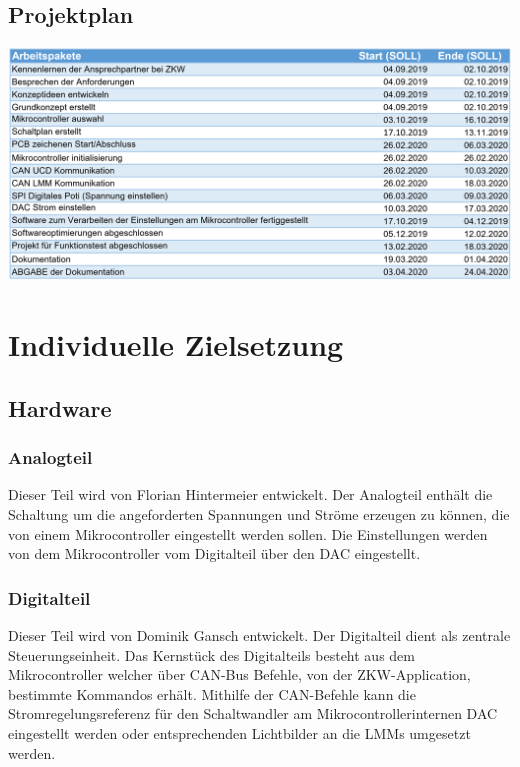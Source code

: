 \documentclass[paper=a4, 12pt]{scrreprt}
\begin{document}
	\section{Projektplan}\hfill \break
	\begin{adjustbox}{center,nofloat=figure,vspace=\bigskipamount}
		\includegraphics[width=\textwidth]{img/plan.PNG}
	\end{adjustbox}
	

\chapter{Individuelle Zielsetzung}\hfill \break
    \section{Hardware}    	\hfill \break
    	\subsection{Analogteil}\hfill \break
        Dieser Teil wird von Florian Hintermeier entwickelt. Der Analogteil enthält die Schaltung um die angeforderten Spannungen und Ströme erzeugen zu können, die von einem Mikrocontroller eingestellt werden sollen. Die Einstellungen werden von dem Mikrocontroller vom Digitalteil über den DAC eingestellt.
        
        \subsection{Digitalteil}\hfill \break
        Dieser Teil wird von Dominik Gansch entwickelt. Der Digitalteil dient als zentrale Steuerungseinheit. Das Kernstück des Digitalteils besteht aus dem Mikrocontroller welcher über CAN-Bus Befehle, von der ZKW-Application, bestimmte Kommandos erhält. Mithilfe der  CAN-Befehle kann die Stromregelungsreferenz für den Schaltwandler am Mikrocontrollerinternen DAC eingestellt werden oder entsprechenden Lichtbilder an die LMMs umgesetzt werden.
\end{document}
